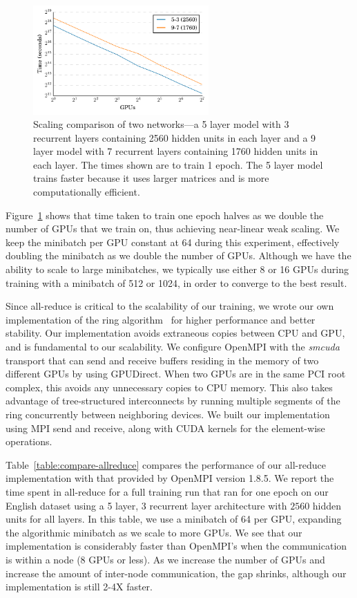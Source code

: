 \documentclass{article}
\begin{document}
\begin{figure}[h]
    \centering
    \includegraphics[width=0.6\textwidth]{speechdl-weakscaling.pdf}
    \caption{Scaling comparison of two networks---a 5 layer model with 3 recurrent layers containing 2560 hidden units in each layer and a 9 layer model with 7 recurrent layers containing 1760 hidden units in each layer. The times shown are to train 1 epoch. The 5 layer model trains faster because it uses larger matrices and is more computationally efficient.}
    \label{fig:speechdl-weakscaling}
\end{figure}

Figure~\ref{fig:speechdl-weakscaling} shows that time taken to train one epoch halves as we double the number of GPUs that we train on, thus achieving near-linear weak scaling. We keep the minibatch per GPU constant at 64 during this experiment, effectively doubling the minibatch as we double the number of GPUs. Although we have the ability to scale to large minibatches, we typically use either 8 or 16 GPUs during training with a minibatch of 512 or 1024, in order to converge to the best result.

Since all-reduce is critical to the scalability of our training, we wrote our own implementation of the ring algorithm~\cite{Patarasuk:2009:BOA:1482176.1482266, Thakur05optimizationof} for higher performance and better stability. Our implementation avoids extraneous copies between CPU and GPU, and is fundamental to our scalability. We configure OpenMPI with the \emph{smcuda} transport that can send and receive buffers residing in the memory of two different GPUs by using GPUDirect. When two GPUs are in the same PCI root complex, this avoids any unnecessary copies to CPU memory. This also takes advantage of tree-structured interconnects by running multiple segments of the ring concurrently between neighboring devices. We built our implementation using MPI send and receive, along with CUDA kernels for the element-wise operations. 

Table~\ref{table:compare-allreduce} compares the performance of our all-reduce implementation with that provided by OpenMPI version 1.8.5. We report the time spent in all-reduce for a full training run that ran for one epoch on our English dataset using a 5 layer, 3 recurrent layer architecture with $2560$ hidden units for all layers. In this table, we use a minibatch of 64 per GPU, expanding the algorithmic minibatch as we scale to more GPUs. We see that our implementation is considerably faster than OpenMPI's when the communication is within a node (8 GPUs or less). As we increase the number of GPUs and increase the amount of inter-node communication, the gap shrinks, although our implementation is still 2-4X faster. 
\end{document}
